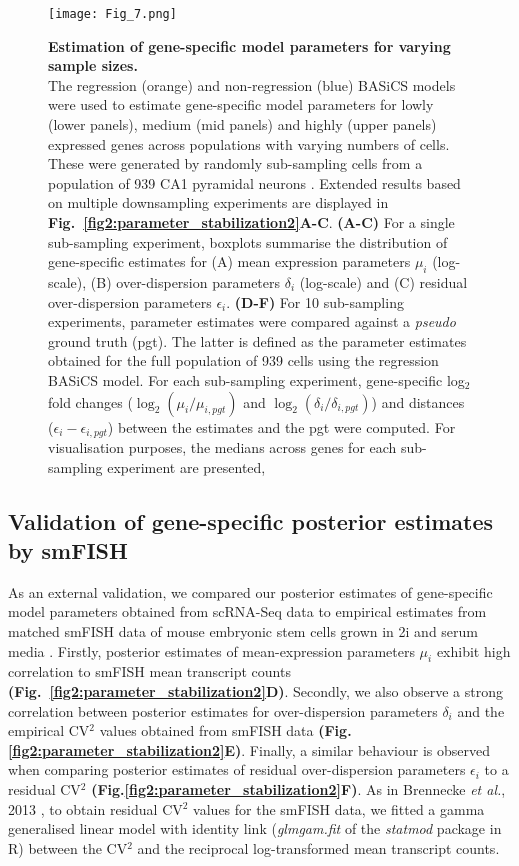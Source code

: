 \begin{figure}[!h]
\centering
\texttt{[image: Fig\_7.png]}
\caption[Estimation of gene-specific model parameters for varying sample sizes]{\textbf{Estimation of gene-specific model parameters for varying sample sizes.}\\
The regression (orange) and non-regression (blue) BASiCS models were used to estimate gene-specific model parameters for lowly (lower panels), medium (mid panels) and highly (upper panels) expressed genes across populations with varying numbers of cells. 
These were generated by randomly sub-sampling cells from a population of 939 CA1 pyramidal neurons \citep{Zeisel2015}. 
Extended results based on multiple downsampling experiments are displayed in \textbf{Fig.~\ref{fig2:parameter_stabilization2}A-C}. 
\textbf{(A-C)} For a single sub-sampling experiment, boxplots summarise the distribution of gene-specific estimates for (A) mean expression parameters $\mu_i$ (log-scale), (B) over-dispersion parameters $\delta_i$ (log-scale) and (C) residual over-dispersion parameters $\epsilon_i$. 
\textbf{(D-F)} For 10 sub-sampling experiments, parameter estimates were compared against a \textit{pseudo} ground truth (pgt). 
The latter is defined as the parameter estimates obtained for the full population of 939 cells using the regression BASiCS model. 
For each sub-sampling experiment, gene-specific log$_2$ fold changes ($\log_2(\mu_i/\mu_{i,pgt})$ and $\log_2(\delta_i/\delta_{i,pgt})$) and distances ($\epsilon_i - \epsilon_{i,pgt}$) between the estimates and the pgt were computed. 
For visualisation purposes, the medians across genes for each sub-sampling experiment are presented,}
\label{fig2:parameter_stabilization}
\end{figure}

\subsection{Validation of gene-specific posterior estimates by smFISH}

As an external validation, we compared our posterior estimates of gene-specific model parameters obtained from scRNA-Seq data to empirical estimates from matched smFISH data of mouse embryonic stem cells grown in 2i and serum media \citep{Grun2014}. 
Firstly, posterior estimates of mean-expression parameters $\mu_i$ exhibit high correlation to smFISH mean transcript counts \textbf{(Fig.~\ref{fig2:parameter_stabilization2}D)}. 
Secondly, we also observe a strong correlation between posterior estimates for over-dispersion parameters $\delta_i$ and the empirical CV$^2$ values obtained from smFISH data \textbf{(Fig.\ref{fig2:parameter_stabilization2}E)}. 
Finally, a similar behaviour is observed when comparing posterior estimates of residual over-dispersion parameters $\epsilon_i$ to a residual CV$^2$ \textbf{(Fig.\ref{fig2:parameter_stabilization2}F)}. 
As in Brennecke \emph{et al.}, 2013 \cite{Brennecke2013}, to obtain residual CV$^2$ values for the smFISH data, we fitted a gamma generalised linear model with identity link (\textit{glmgam.fit} of the \textit{statmod} package in R) between the CV$^2$ and the reciprocal log-transformed mean transcript counts.

